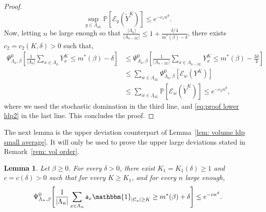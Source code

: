 \documentclass[11pt,a4paper]{article}
\newtheorem{lemma}[theorem]{Lemma}
\theoremstyle{definition}
\numberwithin{equation}{section}
\begin{document}
\begin{proof}
\begin{equation}\label{eq:proof lower ldp2}
    \sup_{y\in \Lambda_{4L}}\mathbb P [\mathcal{E}_y(\tilde{Y}^K)]\leq e^{-c_1n^d}.
\end{equation}
Now, letting $n$ be large enough so that $\tfrac{|\Lambda_n|}{|\Lambda_{n-2L}|}\leq 1+\tfrac{\delta/4}{m^*(\beta)-\delta}$, there exists $c_2=c_2(K,\delta)>0$ such that,
\begin{align}
    \Psi^0_{\Lambda_n,\beta}\left[\frac{1}{|\Lambda_n|}\sum_{x\in \Lambda_n}Y_x^{K}\leq m^*(\beta)-\delta\right]&\leq \Psi^0_{\Lambda_n,\beta}\left[\frac{1}{|\Lambda_{n-2L}|}\sum_{x\in \Lambda_{n-2L}}Y_x^{K}\leq m^*(\beta)-\frac{3\delta}{4}\right]
    \\&\leq \sum_{w\in \Lambda_{4L}} \Psi_{\Lambda_n,\beta}^0[\mathcal{E}_w(Y^K)]
    \\&\leq \sum_{w\in \Lambda_{4L}} \mathbb P[\mathcal{E}_w(\tilde{Y}^K)] \leq e^{-c_2n^d},
\end{align}
where we used the stochastic domination in the third line, and \eqref{eq:proof lower ldp2} in the last line. This concludes the proof.
\end{proof}


The next lemma is the upper deviation counterpart of Lemma~\ref{lem: volume ldp small average}. It will only be used to prove the upper large deviations stated in Remark~\ref{rem: vol order}.

\begin{lemma}\label{lem: volume ldp large average} Let $\beta\geq0$. For every $\delta>0$, there exist $K_1=K_1(\delta)\geq1$ and $c=c(\delta)>0$ such that for every $K\geq K_1$, and for every $n$ large enough,
\begin{equation}
\Psi^0_{\Lambda_n,\beta}\Bigg[ \frac{1}{|\Lambda_n|} \sum_{
x\in \Lambda_n}\mathsf{a}_x\mathbbm{1}_{|\mathcal{C}_x|\geq K}\geq m^*(\beta) + \delta\Bigg]\leq e^{-cn^d}.    
\end{equation}
\end{lemma}
\end{document}
